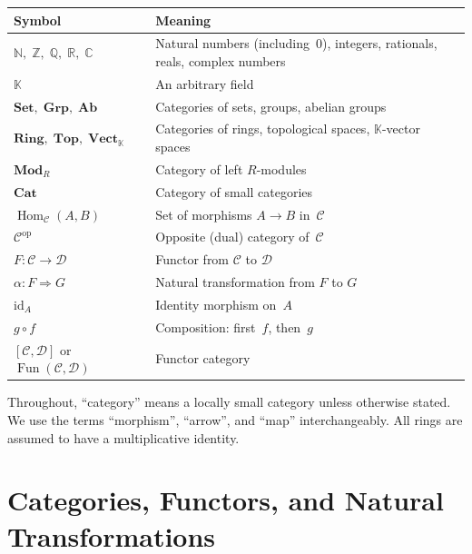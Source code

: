 \documentclass[a4paper,12pt]{book}
\DeclareMathOperator{\Hom}{Hom}
\DeclareMathOperator{\Fun}{Fun}
\newcommand{\Set}{\mathbf{Set}}
\newcommand{\Grp}{\mathbf{Grp}}
\newcommand{\Ab}{\mathbf{Ab}}
\newcommand{\Ring}{\mathbf{Ring}}
\newcommand{\Top}{\mathbf{Top}}
\newcommand{\Vect}{\mathbf{Vect}}
\newcommand{\Mod}{\mathbf{Mod}}
\newcommand{\Cat}{\mathbf{Cat}}
\newcommand{\op}{\mathrm{op}}
\newcommand{\id}{\mathrm{id}}
\newcommand{\N}{\mathbb{N}}
\newcommand{\Z}{\mathbb{Z}}
\newcommand{\Q}{\mathbb{Q}}
\newcommand{\R}{\mathbb{R}}
\newcommand{\C}{\mathbb{C}}
\newcommand{\K}{\mathbb{K}}
\theoremstyle{definition}
\theoremstyle{plain}
\theoremstyle{remark}
\begin{document}
\begin{longtable}{>{\raggedright}p{4cm} p{9.5cm}}
\toprule
\textbf{Symbol} & \textbf{Meaning} \\
\midrule
\endhead
$\N,\;\Z,\;\Q,\;\R,\;\C$ &
    Natural numbers (including~$0$), integers, rationals, reals,
    complex numbers \\[4pt]
$\K$ &
    An arbitrary field \\[4pt]
$\Set,\;\Grp,\;\Ab$ &
    Categories of sets, groups, abelian groups \\[4pt]
$\Ring,\;\Top,\;\Vect_\K$ &
    Categories of rings, topological spaces,
    $\K$-vector spaces \\[4pt]
$\Mod_R$ &
    Category of left $R$-modules \\[4pt]
$\Cat$ &
    Category of small categories \\[4pt]
$\Hom_\mathcal{C}(A,B)$ &
    Set of morphisms $A\to B$ in~$\mathcal{C}$ \\[4pt]
$\mathcal{C}^{\op}$ &
    Opposite (dual) category of~$\mathcal{C}$ \\[4pt]
$F\colon\mathcal{C}\to\mathcal{D}$ &
    Functor from $\mathcal{C}$ to $\mathcal{D}$ \\[4pt]
$\alpha\colon F\Rightarrow G$ &
    Natural transformation from $F$ to $G$ \\[4pt]
$\id_A$ &
    Identity morphism on~$A$ \\[4pt]
$g\circ f$ &
    Composition: first~$f$, then~$g$ \\[4pt]
$[\mathcal{C},\mathcal{D}]$ or $\Fun(\mathcal{C},\mathcal{D})$ &
    Functor category \\[4pt]
\bottomrule
\end{longtable}

\noindent
Throughout, ``category'' means a locally small category unless otherwise
stated.  We use the terms ``morphism'', ``arrow'', and ``map''
interchangeably.  All rings are assumed to have a multiplicative
identity.



\chapter{Categories, Functors, and Natural Transformations}
\label{ch:cat-fun-nat}
\minitoc
\end{document}

